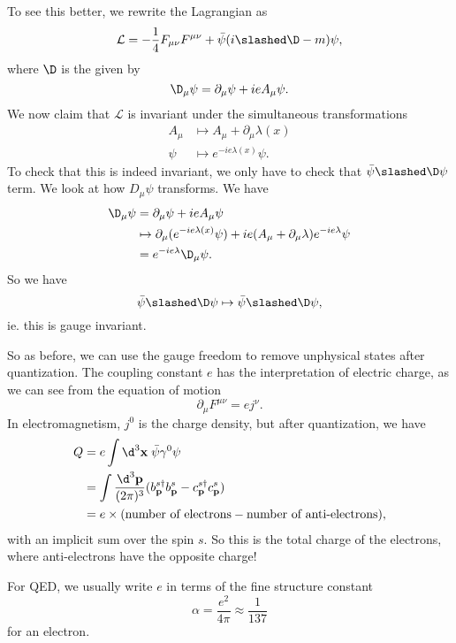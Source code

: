 \documentclass[a4paper]{article}
\begin{document}
To see this better, we rewrite the Lagrangian as
\[
  \mathcal{L} = -\frac{1}{4} F_{\mu\nu} F^{\mu\nu} + \bar\psi(i \slashed \D - m)\psi,
\]
where $\D$ is the  given by
\[
  \D_\mu \psi = \partial_\mu \psi + i e A_\mu \psi.
\]
We now claim that $\mathcal{L}$ is invariant under the simultaneous transformations
\begin{align*}
  A_\mu &\mapsto A_\mu + \partial_\mu \lambda(x)\\
  \psi &\mapsto e^{-ie \lambda(x)} \psi.
\end{align*}
To check that this is indeed invariant, we only have to check that $\bar\psi\slashed \D \psi$ term. We look at how $D_\mu \psi$ transforms. We have
\begin{align*}
  \D_\mu \psi &= \partial_\mu \psi + ie A_\mu \psi\\
  &\mapsto \partial_\mu (e^{-ie\lambda(x)} \psi) + ie (A_\mu + \partial_\mu \lambda) e^{-ie\lambda}\psi\\
  &= e^{-ie\lambda} \D_\mu\psi.
\end{align*}
So we have
\[
  \bar\psi \slashed \D \psi \mapsto \bar\psi \slashed \D \psi,
\]
ie. this is gauge invariant.

So as before, we can use the gauge freedom to remove unphysical states after quantization. The coupling constant $e$ has the interpretation of electric charge, as we can see from the equation of motion
\[
  \partial_\mu F^{\mu\nu} = ej^\nu.
\]
In electromagnetism, $j^0$ is the charge density, but after quantization, we have
\begin{align*}
  Q &= e \int \d^3 \mathbf{x}\; \bar\psi \gamma^0 \psi \\
  &= \int \frac{\d^3 \mathbf{p}}{(2\pi)^3} (b_\mathbf{p}^{s\dagger} b_\mathbf{p}^s - c_\mathbf{p}^{s\dagger} c_\mathbf{p}^s)\\
  &= e \times (\text{number of electrons} - \text{number of anti-electrons}),
\end{align*}
with an implicit sum over the spin $s$. So this is the total charge of the electrons, where anti-electrons have the opposite charge!

For QED, we usually write $e$ in terms of the fine structure constant
\[
  \alpha = \frac{e^2}{4\pi} \approx \frac{1}{137}
\]
for an electron.
\end{document}
